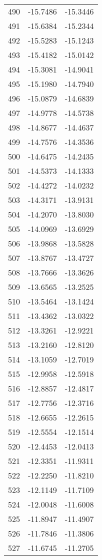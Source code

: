 \documentclass{article}
\begin{document}
\begin{longtable}{|c|c|c|}
490 & -15.7486 & -15.3446 \\
491 & -15.6384 & -15.2344 \\
492 & -15.5283 & -15.1243 \\
493 & -15.4182 & -15.0142 \\
494 & -15.3081 & -14.9041 \\
495 & -15.1980 & -14.7940 \\
496 & -15.0879 & -14.6839 \\
497 & -14.9778 & -14.5738 \\
498 & -14.8677 & -14.4637 \\
499 & -14.7576 & -14.3536 \\
500 & -14.6475 & -14.2435 \\
501 & -14.5373 & -14.1333 \\
502 & -14.4272 & -14.0232 \\
503 & -14.3171 & -13.9131 \\
504 & -14.2070 & -13.8030 \\
505 & -14.0969 & -13.6929 \\
506 & -13.9868 & -13.5828 \\
507 & -13.8767 & -13.4727 \\
508 & -13.7666 & -13.3626 \\
509 & -13.6565 & -13.2525 \\
510 & -13.5464 & -13.1424 \\
511 & -13.4362 & -13.0322 \\
512 & -13.3261 & -12.9221 \\
513 & -13.2160 & -12.8120 \\
514 & -13.1059 & -12.7019 \\
515 & -12.9958 & -12.5918 \\
516 & -12.8857 & -12.4817 \\
517 & -12.7756 & -12.3716 \\
518 & -12.6655 & -12.2615 \\
519 & -12.5554 & -12.1514 \\
520 & -12.4453 & -12.0413 \\
521 & -12.3351 & -11.9311 \\
522 & -12.2250 & -11.8210 \\
523 & -12.1149 & -11.7109 \\
524 & -12.0048 & -11.6008 \\
525 & -11.8947 & -11.4907 \\
526 & -11.7846 & -11.3806 \\
527 & -11.6745 & -11.2705 \\

\end{longtable}
\end{document}
